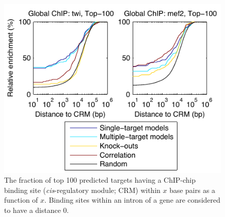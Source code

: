 \documentclass{pnastwo}
\begin{document}
\begin{article}
\begin{figure}[tb]
  \centering
  \includegraphics{fig5}
  \caption{The fraction of top 100 predicted targets having a ChIP-chip
    binding site (\emph{cis}-regulatory module; CRM)
    within $x$ base pairs as a function of $x$.
    Binding sites within an intron of a gene are considered to
    have a distance 0.
    \label{fig:dros_binding_site_distances}}
\end{figure}




\end{article}
\end{document}
